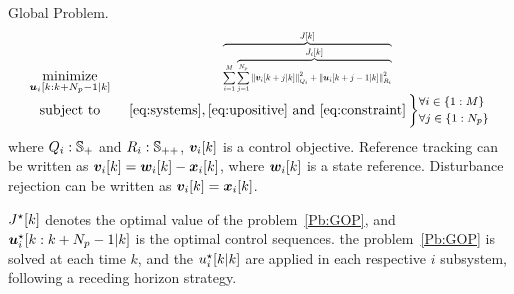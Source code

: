 \documentclass{ifacconf}  %
\begin{document}
\begin{problem}{Global \mpc{} Problem.}\label{Pb:GOP}
\begin{equation*}
\begin{matrix}

\underset{\uiseq}{\mathrm{minimize}}&\resizebox{0.35\textwidth}{!}{$\overbrace{\sum\limits^{M}_{i=1} \overbrace{\sum_{j=1}^{\predhorz} \norm{\mpcvec{v}[i][k+j][k]}^{2}_{Q_i}+\norm{\mpcvec{u}[i][k+j-1][k]}^{2}_{R_i}}^{\textstyle{} \obji}}^{\textstyle{} \globobj}$}\\
\mathrm{subject~ to}&~\eqref{eq:systems},\eqref{eq:upositive}\ \mathrm{and}\ \eqref{eq:constraint}
\left\}\small
\begin{aligned}
  &\forall i\in \{1:\nsubsystems\}\\
  &\forall j\in \{1:\predhorz\}
\end{aligned}\right.

\end{matrix}
\end{equation*}
where ${Q_{i}:\mathbb{S}_{+}}$ and ${R_{i}:\mathbb{S}_{++}}$, $\vik$ is a control objective.
Reference tracking can be written as ${\vik=\wik-\xik}$, where $\wik$ is a state reference.
Disturbance rejection can be written as ${\vik=\xik}$.

$\optglobobj$ denotes the optimal value of the problem~\ref{Pb:GOP}, and ${\optuiseq}$ is the optimal control sequences.
the problem~\ref{Pb:GOP} is solved at each time $k$, and the ${\optuikk}$ are applied in each respective $i$ subsystem, following a receding horizon strategy.
\end{problem}
\end{document}
